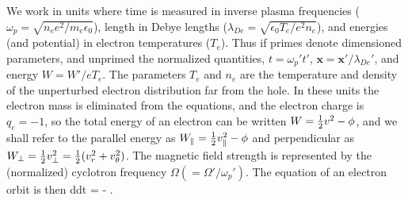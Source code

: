 \documentclass[draft,jgrga]{agutex}
\let\oldequation\equation
\let\oldendequation\endequation
\renewenvironment{equation}
  {\linenomathNonumbers\oldequation}
  {\oldendequation\endlinenomath}
\begin{document}
\begin{article}
We work in units where time is measured in inverse plasma frequencies
($\omega_p=\sqrt{n_ee^2/m_e\epsilon_0}$), length in Debye lengths
($\lambda_{De}=\sqrt{\epsilon_0T_e/e^2n_e}$), and energies (and
potential) in electron temperatures ($T_e$). Thus if primes denote
dimensioned parameters, and unprimed the normalized quantities,
$t=\omega_p't'$, $\bm{x}=\bm{x}'/\lambda_{De}'$, and energy
$W=W'/eT_e$. The parameters $T_e$ and $n_e$ are the temperature and
density of the unperturbed electron distribution far from the hole.
In these units the electron mass is eliminated from the equations, and
the electron charge is $q_e=-1$, so the total energy of an electron
can be written $W={1\over2}v^2-\phi$, and we shall refer to the
parallel energy as $W_\parallel={1\over2}v_\parallel^2-\phi$ and
perpendicular as
$W_\perp = {1\over2}v_\perp^2={1\over2}(v_r^2+v_\theta^2)$. The
magnetic field strength is represented by the (normalized) cyclotron
frequency $\Omega(=\Omega'/\omega_p')$. The equation of an electron
orbit is then
\begin{equation}
  \label{eq:orbit}
  {d\over dt} = \bm\nabla \phi - \times\Omega{}.
\end{equation}


\end{article}
\end{document}
